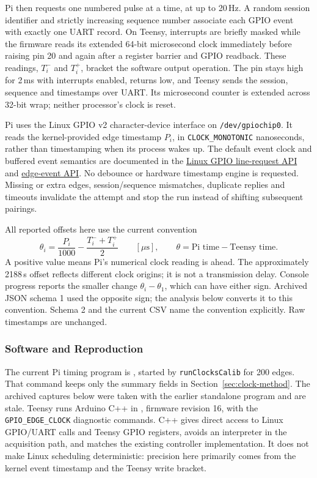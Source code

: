 Pi then requests one numbered pulse at a time, at up to 20\,Hz. A random session identifier and strictly increasing sequence number associate each GPIO event with exactly one UART record. On Teensy, interrupts are briefly masked while the firmware reads its extended 64-bit microsecond clock immediately before raising pin 20 and again after a register barrier and GPIO readback. These readings, $T_i^-$ and $T_i^+$, bracket the software output operation. The pin stays high for 2\,ms with interrupts enabled, returns low, and Teensy sends the session, sequence and timestamps over UART. Its microsecond counter is extended across 32-bit wrap; neither processor's clock is reset.

Pi uses the Linux GPIO v2 character-device interface on \texttt{/dev/gpiochip0}. It reads the kernel-provided edge timestamp $P_i$, in \texttt{CLOCK\_MONOTONIC} nanoseconds, rather than timestamping when its process wakes up. The default event clock and buffered event semantics are documented in the \href{https://www.kernel.org/doc/html/latest/userspace-api/gpio/gpio-v2-get-line-ioctl.html}{Linux GPIO line-request API} and \href{https://www.kernel.org/doc/html/latest/userspace-api/gpio/gpio-v2-line-event-read.html}{edge-event API}. No debounce or hardware timestamp engine is requested. Missing or extra edges, session/sequence mismatches, duplicate replies and timeouts invalidate the attempt and stop the run instead of shifting subsequent pairings.

All reported offsets here use the current convention
\begin{equation}
 \theta_i = \frac{P_i}{1000}-\frac{T_i^-+T_i^+}{2}
 \qquad [\mu\mathrm{s}], \qquad \theta=\text{Pi time}-\text{Teensy time}.
\end{equation}
A positive value means Pi's numerical clock reading is ahead. The approximately 2188\,s offset reflects different clock origins; it is not a transmission delay. Console progress reports the smaller change $\theta_i-\theta_1$, which can have either sign. Archived JSON schema 1 used the opposite sign; the analysis below converts it to this convention. Schema 2 and the current CSV name the convention explicitly. Raw timestamps are unchanged.

\subsubsection{Software and Reproduction}
The current Pi timing program is , started by \texttt{runClocksCalib} for 200 edges. That command keeps only the summary fields in Section~\ref{sec:clock-method}. The archived captures below were taken with the earlier standalone program  and are stale. Teensy runs Arduino C++ in , firmware revision 16, with the \texttt{GPIO\_EDGE\_CLOCK} diagnostic commands. C++ gives direct access to Linux GPIO/UART calls and Teensy GPIO registers, avoids an interpreter in the acquisition path, and matches the existing controller implementation. It does not make Linux scheduling deterministic: precision here primarily comes from the kernel event timestamp and the Teensy write bracket.

